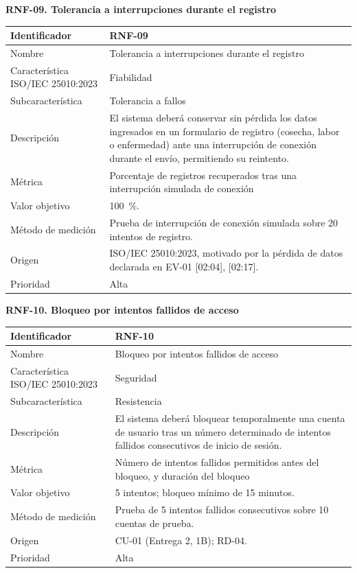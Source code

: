 \documentclass[12pt,a4paper]{article}
\begin{document}
\bigskip
\noindent\textbf{RNF-09. Tolerancia a interrupciones durante el registro}
\label{tab:RNF-09}

\begin{center}
\begin{longtable}{|p{4.2cm}|p{10cm}|}
\hline
Identificador & RNF-09 \\
\hline
Nombre & Tolerancia a interrupciones durante el registro \\
\hline
Característica ISO/IEC 25010:2023 & Fiabilidad \\
\hline
Subcaracterística & Tolerancia a fallos \\
\hline
Descripción & El sistema deberá conservar sin pérdida los datos ingresados en un formulario de registro (cosecha, labor o enfermedad) ante una interrupción de conexión durante el envío, permitiendo su reintento. \\
\hline
Métrica & Porcentaje de registros recuperados tras una interrupción simulada de conexión \\
\hline
Valor objetivo & 100~\%. \\
\hline
Método de medición & Prueba de interrupción de conexión simulada sobre 20 intentos de registro. \\
\hline
Origen & ISO/IEC 25010:2023, motivado por la pérdida de datos declarada en EV-01 [02:04], [02:17]. \\
\hline
Prioridad & Alta \\
\hline
\end{longtable}
\end{center}

\bigskip
\noindent\textbf{RNF-10. Bloqueo por intentos fallidos de acceso}
\label{tab:RNF-10}

\begin{center}
\begin{longtable}{|p{4.2cm}|p{10cm}|}
\hline
Identificador & RNF-10 \\
\hline
Nombre & Bloqueo por intentos fallidos de acceso \\
\hline
Característica ISO/IEC 25010:2023 & Seguridad \\
\hline
Subcaracterística & Resistencia \\
\hline
Descripción & El sistema deberá bloquear temporalmente una cuenta de usuario tras un número determinado de intentos fallidos consecutivos de inicio de sesión. \\
\hline
Métrica & Número de intentos fallidos permitidos antes del bloqueo, y duración del bloqueo \\
\hline
Valor objetivo & 5 intentos; bloqueo mínimo de 15 minutos. \\
\hline
Método de medición & Prueba de 5 intentos fallidos consecutivos sobre 10 cuentas de prueba. \\
\hline
Origen & CU-01 (Entrega 2, 1B); RD-04. \\
\hline
Prioridad & Alta \\
\hline
\end{longtable}
\end{center}
\end{document}
